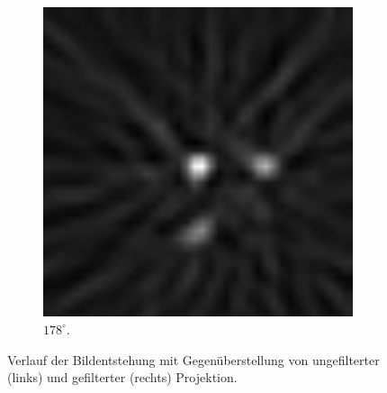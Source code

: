 \documentclass[slug=PET, room=Andreas-Schubert-Bau\,\ 424A, supervisor=Carsten\ Bittrich, coursedate=10.\ 01.\ 2020]{../../Lab_Report_LaTeX/lab_report}
\begin{document}
\begin{figure}[htp]
\begin{subfigure}{0.5\textwidth}
    \includegraphics[width=.4\textwidth]{../messungen/oliTOM1/15_gefiltert.png}
    \caption{\(178^\circ\).}
    \label{eq:tom1-178}
  \end{subfigure}
  \caption{Verlauf der Bildentstehung mit Gegenüberstellung von
    ungefilterter (links) und gefilterter (rechts) Projektion.}
  \label{fig:tom1}
\end{figure}
\end{document}

